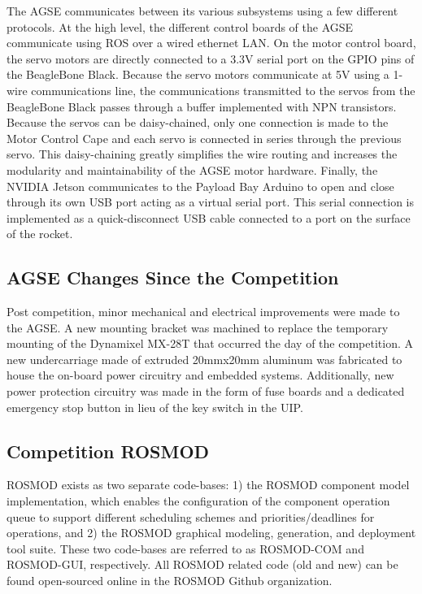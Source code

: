 The AGSE communicates between its various subsystems using a few
different protocols.  At the high level, the different control boards
of the AGSE communicate using ROS over a wired ethernet LAN.  On the
motor control board, the servo motors are directly connected to a 3.3V
serial port on the GPIO pins of the BeagleBone Black.  Because the
servo motors communicate at 5V using a 1-wire communications line, the
communications transmitted to the servos from the BeagleBone Black
passes through a buffer implemented with NPN transistors.  Because the
servos can be daisy-chained, only one connection is made to the Motor
Control Cape and each servo is connected in series through the
previous servo.  This daisy-chaining greatly simplifies the wire
routing and increases the modularity and maintainability of the AGSE
motor hardware.  Finally, the NVIDIA Jetson communicates to the
Payload Bay Arduino to open and close through its own USB port acting
as a virtual serial port.  This serial connection is implemented as a
quick-disconnect USB cable connected to a port on the surface of the
rocket.

\subsection{AGSE Changes Since the Competition}

Post competition, minor mechanical and electrical improvements were made to the AGSE.  A new mounting bracket was machined to replace the temporary mounting of the Dynamixel MX-28T that occurred the day of the competition. A new undercarriage made of extruded 20mmx20mm aluminum was fabricated to house the on-board power circuitry and embedded systems.  Additionally, new power protection circuitry was made in the form of fuse boards and a dedicated emergency stop button in lieu of the key switch in the UIP.

\subsection{Competition ROSMOD}

ROSMOD exists as two separate code-bases: 1) the ROSMOD component
model implementation, which enables the configuration of the component
operation queue to support different scheduling schemes and
priorities/deadlines for operations, and 2) the ROSMOD graphical
modeling, generation, and deployment tool suite.  These two code-bases
are referred to as ROSMOD-COM and ROSMOD-GUI, respectively.  All
ROSMOD related code (old and new) can be found open-sourced online in
the ROSMOD Github organization\cite{ROSMOD_ORG}.

